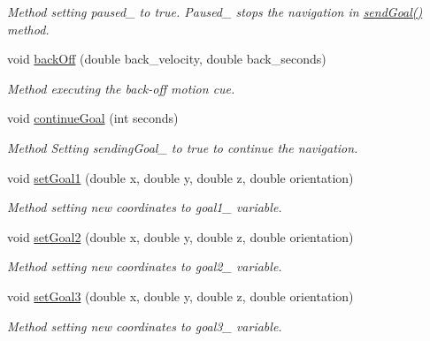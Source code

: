 \begin{DoxyCompactItemize}
\begin{DoxyCompactList}\small\item\em Method setting paused\+\_\+ to true. Paused\+\_\+ stops the navigation in \hyperlink{classlfe__navigation_1_1NavigationManager_a708b61e1da4997d9e52dba82ce8abdb9}{send\+Goal()} method. \end{DoxyCompactList}\item 
void \hyperlink{classlfe__navigation_1_1NavigationManager_ac779f9a9e239b22a3c3442f4fccafced}{back\+Off} (double back\+\_\+velocity, double back\+\_\+seconds)
\begin{DoxyCompactList}\small\item\em Method executing the back-\/off motion cue. \end{DoxyCompactList}\item 
void \hyperlink{classlfe__navigation_1_1NavigationManager_a52d2f66551c0537ee109013bb0a4fb06}{continue\+Goal} (int seconds)
\begin{DoxyCompactList}\small\item\em Method Setting sending\+Goal\+\_\+ to true to continue the navigation. \end{DoxyCompactList}\item 
void \hyperlink{classlfe__navigation_1_1NavigationManager_a6294d8559a40febde615c1d91e79a6ff}{set\+Goal1} (double x, double y, double z, double orientation)
\begin{DoxyCompactList}\small\item\em Method setting new coordinates to goal1\+\_\+ variable. \end{DoxyCompactList}\item 
void \hyperlink{classlfe__navigation_1_1NavigationManager_add3a6bd2acafa6f4ac950d71603bd97e}{set\+Goal2} (double x, double y, double z, double orientation)
\begin{DoxyCompactList}\small\item\em Method setting new coordinates to goal2\+\_\+ variable. \end{DoxyCompactList}\item 
void \hyperlink{classlfe__navigation_1_1NavigationManager_a8a751145c42018976caf845a64c8f6ea}{set\+Goal3} (double x, double y, double z, double orientation)
\begin{DoxyCompactList}\small\item\em Method setting new coordinates to goal3\+\_\+ variable. \end{DoxyCompactList}\end{DoxyCompactItemize}


